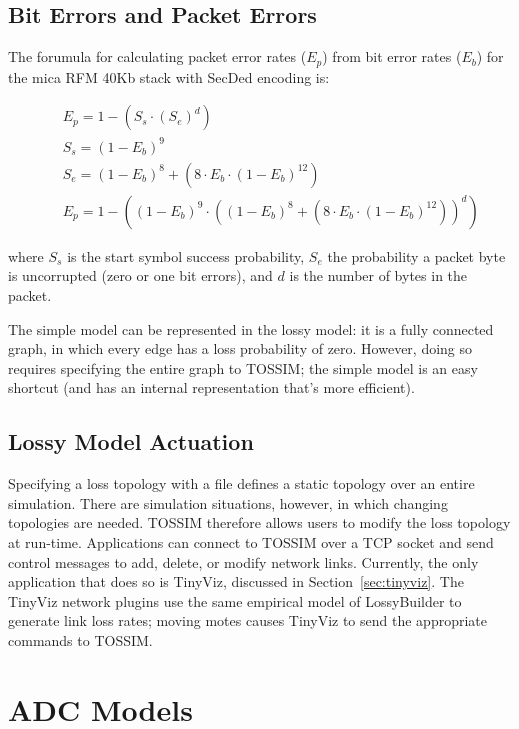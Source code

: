 \documentclass[10pt,fleqn]{article}
\def\sim{TOSSIM\xspace}
\begin{document}
\subsection{Bit Errors and Packet Errors}

The forumula for calculating packet error rates ($E_{p}$) from bit
error rates ($E_{b}$) for the mica RFM 40Kb stack with SecDed encoding
is:

\begin{eqnarray*}
&&E_{p} = 1 - (S_{s} \cdot (S_{e})^{d})\\
&&S_{s} = (1 - E_{b})^{9}\\
&&S_{e} = (1 - E_{b})^{8} + (8 \cdot E_{b} \cdot (1 - E_{b})^{12})\\
&&E_{p} = 1 - ((1 - E_{b})^{9} \cdot ((1 - E_{b})^{8} + (8 \cdot E_{b} \cdot (1 - E_{b})^{12}))^{d})
\end{eqnarray*}

where $S_{s}$ is the start symbol success probability, $S_{e}$ the
probability a packet byte is uncorrupted (zero or one bit errors), and
$d$ is the number of bytes in the packet.

The simple model can be represented in the lossy model: it is a fully
connected graph, in which every edge has a loss probability of
zero. However, doing so requires specifying the entire graph to \sim;
the simple model is an easy shortcut (and has an internal
representation that's more efficient).

\subsection{Lossy Model Actuation}

Specifying a loss topology with a file defines a static topology over
an entire simulation. There are simulation situations, however, in
which changing topologies are needed. \sim therefore allows users to
modify the loss topology at run-time. Applications can connect to \sim
over a TCP socket and send control messages to add, delete, or modify
network links. Currently, the only application that does so is
TinyViz, discussed in Section~\ref{sec:tinyviz}. The TinyViz network
plugins use the same empirical model of LossyBuilder to generate link
loss rates; moving motes causes TinyViz to send the appropriate
commands to \sim.

\section{ADC Models}
\label{sec:adc}
\end{document}
